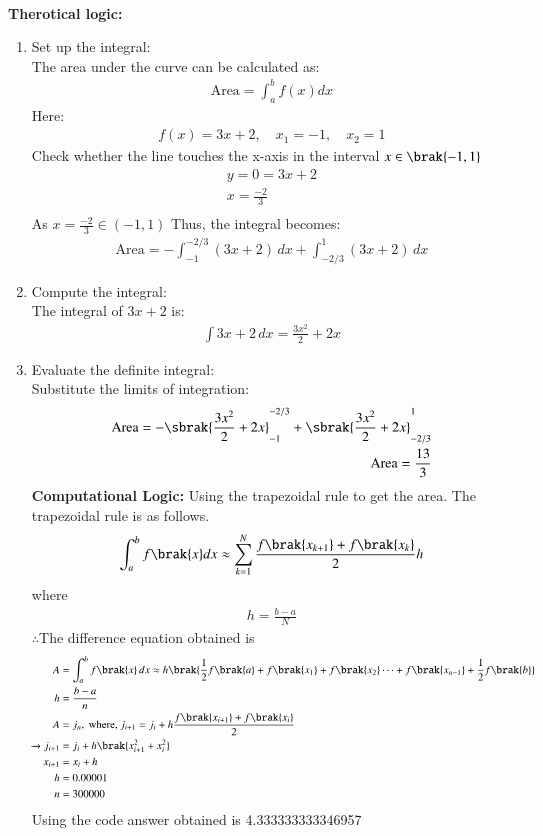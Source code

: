 \documentclass[journal]{IEEEtran}
\begin{document}
\solution\\
\textbf{Therotical logic:}
\begin{enumerate}
    \item Set up the integral: \\
    The area under the curve can be calculated as:
    \begin{align}
          \text{Area}=\int_{a}^{b}f(x)dx
    \end{align}
    Here:
    \begin{align}
    f(x) = 3x+2, \quad x_1 = -1, \quad x_2 = 1
    \end{align}
    Check whether the line touches the x-axis in the interval $x\in\brak{-1,1}$ \\
    \begin{align}
        y=0=3x+2\\
        x=\frac{-2}{3}\\
    \end{align}
		As $x=\frac{-2}{3}\in (-1,1)$
    Thus, the integral becomes:
    \begin{align}
    \text{Area} = -\int_{-1}^{-2/3} (3x+2)  \, dx+\int_{-2/3}^{1} (3x+2) \, dx
    \end{align}
    \item Compute the integral: \\
    The integral of $3x+2$ is:
    \begin{align}
    \int 3x+2 \, dx = \frac{3x^2}{2}+2x
    \end{align}
    \item Evaluate the definite integral: \\
    Substitute the limits of integration:
    \begin{align}
    \text{Area} = -\sbrak{\frac{3x^2}{2}+2x}_{-1}^{-2/3}+\sbrak{\frac{3x^2}{2}+2x}_{-2/3}^{1} \\
    \text{Area} = \frac{13}{3}
    \end{align}
\textbf{Computational Logic:} 
Using the trapezoidal rule to get the area. The trapezoidal rule is as follows.
\begin{align}
    \int^{b}_{a} f\brak{x}dx\approx \sum^{N}_{k=1}\frac{f\brak{x_{k+1}}+f\brak{x_{k}}}{2}h
\end{align}
where
\begin{align}
    h=\frac{b-a}{N}
\end{align}
$\therefore$The difference equation obtained is\\
\begin{align}
    A &= \int_a^b f\brak{x}\, dx \approx h\brak{\frac{1}{2}f\brak{a} + f\brak{x_1} + f\brak{x_2} \cdots + f\brak{x_{n-1}} + \frac{1}{2}f\brak{b}}\\
    h &= \frac{b-a}{n}\\
    A &= j_n, \text{ where, } j_{i + 1} = j_i + h\frac{f\brak{x_{i+1}} + f\brak{x_i}}{2}\\ 
        \xrightarrow{} j_{i + 1} &= j_i + h\brak{{x_{i+1}^2}+{x_{i}^2}}\\
    x_{i+1} &= x_i + h\\
    h&=0.00001\\
    n&=300000
\end{align}
Using the code answer obtained is 4.333333333346957


\end{enumerate}
\end{document}

